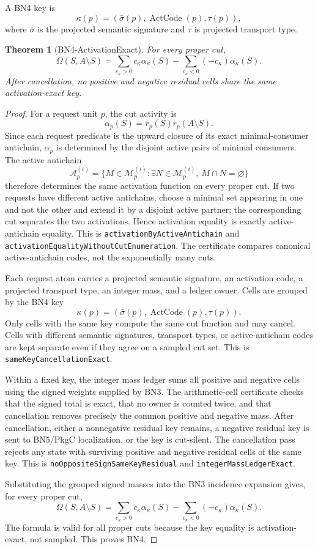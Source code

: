 \documentclass[10.5pt,a4paper]{article}
\newtheorem{theorem}{Theorem}[section]
\newcommand{\ActCode}{\operatorname{ActCode}}
\begin{document}
A BN4 key is
\[
\kappa(p)=(\bar\sigma(p),\ActCode(p),\tau(p)),
\]
where \(\bar\sigma\) is the projected semantic signature and \(\tau\) is projected transport type.

\begin{theorem}[BN4-ActivationExact]
For every proper cut,
\[
\Omega(S,A\setminus S)=
\sum_{c_\kappa>0}c_\kappa\alpha_\kappa(S)-
\sum_{c_\kappa<0}(-c_\kappa)\alpha_\kappa(S).
\]
After cancellation, no positive and negative residual cells share the same activation-exact key.
\end{theorem}

\begin{proof}
For a request unit \(p\), the cut activity is
\[
\alpha_p(S)=r_p(S)r_p(A\setminus S).
\]
Since each request predicate is the upward closure of its exact minimal-consumer antichain, \(\alpha_p\) is determined by the disjoint active pairs of minimal consumers.  The active antichain
\[
\mathcal A_p^{(i)}=\{M\in\mathcal M_p^{(i)}:\exists N\in\mathcal M_p^{(i)},\ M\cap N=\varnothing\}
\]
therefore determines the same activation function on every proper cut.  If two requests have different active antichains, choose a minimal set appearing in one and not the other and extend it by a disjoint active partner; the corresponding cut separates the two activations.  Hence activation equality is exactly active-antichain equality.  This is \texttt{activationByActiveAntichain} and \texttt{activationEqualityWithoutCutEnumeration}.  The certificate compares canonical active-antichain codes, not the exponentially many cuts.

Each request atom carries a projected semantic signature, an activation code, a projected transport type, an integer mass, and a ledger owner.  Cells are grouped by the BN4 key
\[
\kappa(p)=(\bar\sigma(p),\ActCode(p),\tau(p)).
\]
Only cells with the same key compute the same cut function and may cancel.  Cells with different semantic signatures, transport types, or active-antichain codes are kept separate even if they agree on a sampled cut set.  This is \texttt{sameKeyCancellationExact}.

Within a fixed key, the integer mass ledger sums all positive and negative cells using the signed weights supplied by BN3.  The arithmetic-cell certificate checks that the signed total is exact, that no owner is counted twice, and that cancellation removes precisely the common positive and negative mass.  After cancellation, either a nonnegative residual key remains, a negative residual key is sent to BN5/PkgC localization, or the key is cut-silent.  The cancellation pass rejects any state with surviving positive and negative residual cells of the same key.  This is \texttt{noOppositeSignSameKeyResidual} and \texttt{integerMassLedgerExact}.

Substituting the grouped signed masses into the BN3 incidence expansion gives, for every proper cut,
\[
\Omega(S,A\setminus S)=
\sum_{c_\kappa>0}c_\kappa\alpha_\kappa(S)-
\sum_{c_\kappa<0}(-c_\kappa)\alpha_\kappa(S).
\]
The formula is valid for all proper cuts because the key equality is activation-exact, not sampled.  This proves BN4.
\end{proof}
\end{document}
